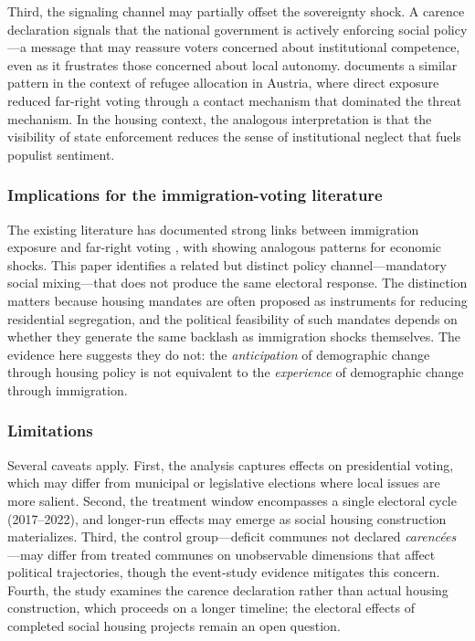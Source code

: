 \documentclass[12pt]{article}
\begin{document}
Third, the signaling channel may partially offset the sovereignty shock. A carence declaration signals that the national government is actively enforcing social policy---a message that may reassure voters concerned about institutional competence, even as it frustrates those concerned about local autonomy. \citet{steinmayr2021} documents a similar pattern in the context of refugee allocation in Austria, where direct exposure reduced far-right voting through a contact mechanism that dominated the threat mechanism. In the housing context, the analogous interpretation is that the visibility of state enforcement reduces the sense of institutional neglect that fuels populist sentiment.

\subsubsection*{Implications for the immigration-voting literature} The existing literature has documented strong links between immigration exposure and far-right voting \citep{dustmann2019, edo2019, barone2016, halla2017}, with \citet{autor2020} showing analogous patterns for economic shocks. This paper identifies a related but distinct policy channel---mandatory social mixing---that does not produce the same electoral response. The distinction matters because housing mandates are often proposed as instruments for reducing residential segregation, and the political feasibility of such mandates depends on whether they generate the same backlash as immigration shocks themselves. The evidence here suggests they do not: the \textit{anticipation} of demographic change through housing policy is not equivalent to the \textit{experience} of demographic change through immigration.

\subsubsection*{Limitations} Several caveats apply. First, the analysis captures effects on presidential voting, which may differ from municipal or legislative elections where local issues are more salient. Second, the treatment window encompasses a single electoral cycle (2017--2022), and longer-run effects may emerge as social housing construction materializes. Third, the control group---deficit communes not declared \textit{caren\-c\'{e}es}---may differ from treated communes on unobservable dimensions that affect political trajectories, though the event-study evidence mitigates this concern. Fourth, the study examines the carence declaration rather than actual housing construction, which proceeds on a longer timeline; the electoral effects of completed social housing projects remain an open question.
\end{document}

